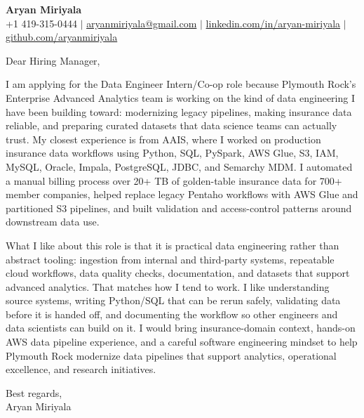 \documentclass[letterpaper,11pt]{article}
\begin{document}
\begin{center}
{\Large \textbf{Aryan Miriyala}}\\
\vspace{2pt}
+1 419-315-0444 $|$ \href{mailto:aryanmiriyala@gmail.com}{aryanmiriyala@gmail.com} $|$
\href{https://www.linkedin.com/in/aryan-miriyala-7788a21b6/}{linkedin.com/in/aryan-miriyala} $|$
\href{https://github.com/aryanmiriyala}{github.com/aryanmiriyala}
\end{center}

\vspace{12pt}

Dear Hiring Manager,

I am applying for the Data Engineer Intern/Co-op role because Plymouth Rock's Enterprise Advanced Analytics team is working on the kind of data engineering I have been building toward: modernizing legacy pipelines, making insurance data reliable, and preparing curated datasets that data science teams can actually trust. My closest experience is from AAIS, where I worked on production insurance data workflows using Python, SQL, PySpark, AWS Glue, S3, IAM, MySQL, Oracle, Impala, PostgreSQL, JDBC, and Semarchy MDM. I automated a manual billing process over 20+ TB of golden-table insurance data for 700+ member companies, helped replace legacy Pentaho workflows with AWS Glue and partitioned S3 pipelines, and built validation and access-control patterns around downstream data use.

What I like about this role is that it is practical data engineering rather than abstract tooling: ingestion from internal and third-party systems, repeatable cloud workflows, data quality checks, documentation, and datasets that support advanced analytics. That matches how I tend to work. I like understanding source systems, writing Python/SQL that can be rerun safely, validating data before it is handed off, and documenting the workflow so other engineers and data scientists can build on it. I would bring insurance-domain context, hands-on AWS data pipeline experience, and a careful software engineering mindset to help Plymouth Rock modernize data pipelines that support analytics, operational excellence, and research initiatives.

Best regards,\\
Aryan Miriyala
\end{document}
